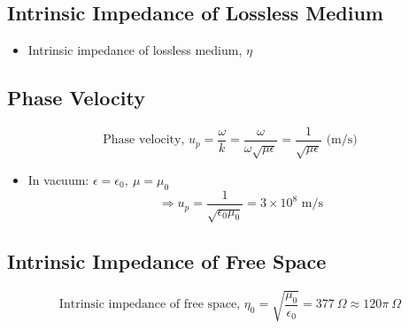 \documentclass[a4paper]{article}
\begin{document}
\subsection{Intrinsic Impedance of Lossless Medium}
\begin{itemize}
    \item Intrinsic impedance of lossless medium, $\eta$
    \begin{center}
    \end{center}
\end{itemize}

\subsection{Phase Velocity}
$$\text{Phase velocity, }u_p = \frac{\omega}{k} = \frac{\omega}{\omega\sqrt{\mu\epsilon}} = \frac{1}{\sqrt{\mu\epsilon}}\text{ (m/s)}$$
\begin{itemize}
    \item In vacuum: $\epsilon = \epsilon_0,\ \mu = \mu_0$
    $$\Rightarrow u_p = \frac{1}{\sqrt{\epsilon_0\mu_0}} = 3\times10^8\text{ m/s}$$
\end{itemize}

\subsection{Intrinsic Impedance of Free Space}
$$\text{Intrinsic impedance of free space, }\eta_0 = \sqrt{\frac{\mu_0}{\epsilon_0}} = 377\ \Omega \approx 120\pi\ \Omega$$
\end{document}
